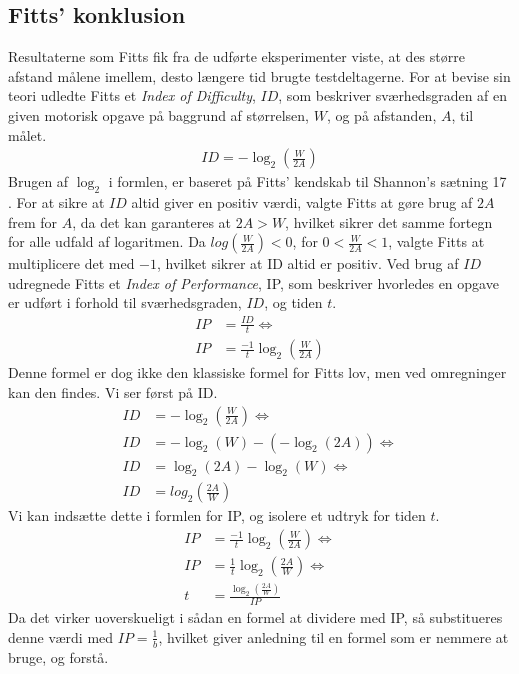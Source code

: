 \subsection*{Fitts' konklusion}
Resultaterne som Fitts fik fra de udførte eksperimenter viste, at des større afstand målene imellem, desto længere tid brugte testdeltagerne. For at bevise sin teori udledte Fitts et \textit{Index of Difficulty}, $ID$, som beskriver sværhedsgraden af en given motorisk opgave på baggrund af størrelsen, $W$, og på afstanden, $A$, til målet.
\begin{align*}
ID = -\log_2\left(\frac{W}{2A}\right)
\end{align*}
Brugen af $\log_2$ i formlen, er baseret på Fitts' kendskab til Shannon's sætning 17 \cite{goldberg2015}. For at sikre at $ID$ altid giver en positiv værdi, valgte Fitts at gøre brug af $2A$ frem for $A$, da det kan garanteres at $2A > W$, hvilket sikrer det samme fortegn for alle udfald af logaritmen. Da $log\left(\frac{W}{2A}\right)<0$, for $0<\frac{W}{2A}<1$, valgte Fitts at multiplicere det med $-1$, hvilket sikrer at ID altid er positiv.
Ved brug af $ID$ udregnede Fitts et \textit{Index of Performance}, IP, som beskriver hvorledes en opgave er udført i forhold til sværhedsgraden, $ID$, og tiden $t$.
\begin{align*}
IP &= \frac{ID}{t}\Leftrightarrow\\
IP &= \frac{-1}{t}\log_2\left(\frac{W}{2A}\right)
\end{align*}
Denne formel er dog ikke den klassiske formel for Fitts lov, men ved omregninger kan den findes. Vi ser først på ID.
\begin{align*}
ID &= -\log_2\left(\frac{W}{2A}\right) \Leftrightarrow\\
ID &= -\log_2\left(W\right)-\left(-\log_2\left(2A\right)\right) \Leftrightarrow\\
ID &= \log_2\left(2A\right)-\log_2\left(W\right) \Leftrightarrow\\
ID &= log_2\left(\frac{2A}{W}\right)
\end{align*}
Vi kan indsætte dette i formlen for IP, og isolere et udtryk for tiden $t$.
\begin{align*}
IP &=\frac{-1}{t}\log_2\left(\frac{W}{2A}\right) \Leftrightarrow\\ 
IP &= \frac{1}{t}\log_2\left(\frac{2A}{W}\right) \Leftrightarrow\\ 
t &= \frac{\log_2\left(\frac{2A}{W}\right)}{IP}
\end{align*}
Da det virker uoverskueligt i sådan en formel at dividere med IP, så substitueres denne værdi med $IP = \frac{1}{b}$, hvilket giver anledning til en formel som er nemmere at bruge, og forstå.

